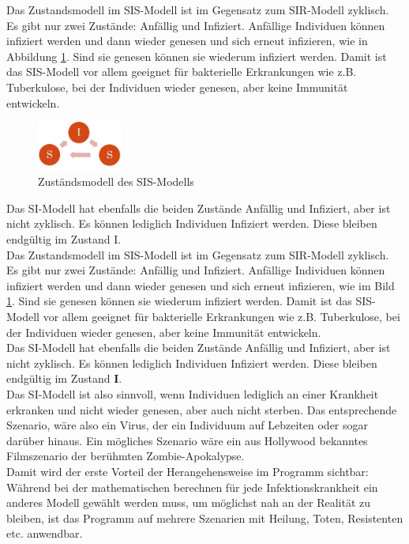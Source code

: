 Das Zustandsmodell im SIS-Modell ist im Gegensatz zum SIR-Modell zyklisch. Es gibt nur zwei Zustände: Anfällig und Infiziert. Anfällige Individuen können infiziert werden und dann wieder genesen und sich erneut infizieren, wie in Abbildung \ref{fig:sis}. Sind sie genesen können sie wiederum infiziert werden. Damit ist das SIS-Modell vor allem geeignet für bakterielle Erkrankungen wie z.B. Tuberkulose, bei der Individuen wieder genesen, aber keine Immunität entwickeln. 
\begin{figure}[H]
	\centering
	\includegraphics[width= 0.25\textwidth]{./images/SIS-Modell.jpg}\caption{Zuständsmodell des SIS-Modells}\label{fig:sis}
\end{figure}
Das SI-Modell hat ebenfalls die beiden Zustände Anfällig und Infiziert, aber ist nicht zyklisch. Es können lediglich Individuen Infiziert werden. Diese bleiben endgültig im Zustand I.\\ 

Das Zustandsmodell im SIS-Modell ist im Gegensatz zum SIR-Modell zyklisch. Es gibt nur zwei Zustände: Anfällig und Infiziert. Anfällige Individuen können infiziert werden und dann wieder genesen und sich erneut infizieren, wie im Bild \ref{fig:sis}. Sind sie genesen können sie wiederum infiziert werden. Damit ist das SIS-Modell vor allem geeignet für bakterielle Erkrankungen wie z.B. Tuberkulose, bei der Individuen wieder genesen, aber keine Immunität entwickeln. \\
Das SI-Modell hat ebenfalls die beiden Zustände Anfällig und Infiziert, aber ist nicht zyklisch. Es können lediglich Individuen Infiziert werden. Diese bleiben endgültig im Zustand \textbf{I}.\\ 

Das SI-Modell ist also sinnvoll, wenn Individuen lediglich an einer Krankheit erkranken und nicht wieder genesen, aber auch nicht sterben. Das entsprechende Szenario, wäre also ein Virus, der ein Individuum auf Lebzeiten oder sogar darüber hinaus. Ein mögliches Szenario wäre ein aus Hollywood bekanntes Filmszenario der berühmten Zombie-Apokalypse.\\
Damit wird der erste Vorteil der Herangehensweise im Programm sichtbar: Während bei der mathematischen berechnen für jede Infektionskrankheit ein anderes Modell gewählt werden muss, um möglichst nah an der Realität zu bleiben, ist das Programm auf mehrere Szenarien mit Heilung, Toten, Resistenten etc. anwendbar.